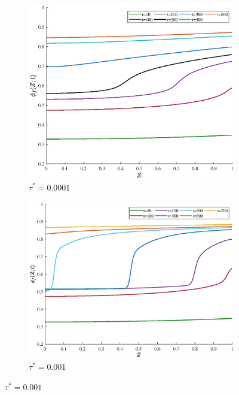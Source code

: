 \documentclass[12pt]{extarticle}
\begin{document}
\begin{figure}
	\hspace{-4mm}
	\begin{subfigure}{0.24\textwidth}
		\includegraphics[scale=0.17]{images/seriestau1e-5}
		\caption{$\tau^*=0.0001$}
	\end{subfigure}	
\hspace{1mm}
	\begin{subfigure}{0.24\textwidth}
		\includegraphics[scale=0.18]{images/series1tau0_001}
		\caption{$\tau^*=0.001$}
	\end{subfigure}
\hspace{1mm}

\end{figure}
\end{document}
